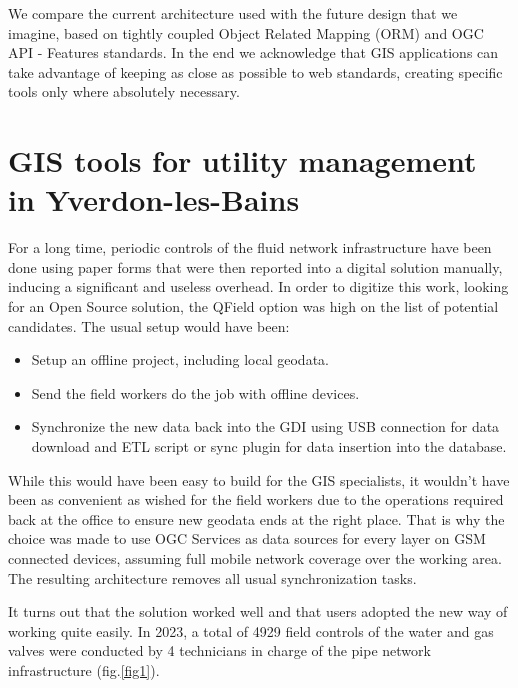 \documentclass[runningheads]{llncs}
\begin{document}
We compare the current architecture used with the future design that we imagine, based on tightly coupled Object Related Mapping (ORM) and OGC API - Features standards. In the end we acknowledge that GIS applications can take advantage of keeping as close as possible to web standards, creating specific tools only where absolutely necessary.

\section{GIS tools for utility management in Yverdon-les-Bains}

For a long time, periodic controls of the fluid network infrastructure have been done using paper forms that were then reported into a digital solution manually, inducing a significant and useless overhead. In order to digitize this work, looking for an Open Source solution, the QField option was high on the list of potential candidates. The usual setup would have been:
\begin{itemize}
	\item Setup an offline project, including local geodata.
	\item Send the field workers do the job with offline devices.
	\item Synchronize the new data back into the GDI using USB connection for data download and ETL script or sync plugin for data insertion into the database.
\end{itemize}



While this would have been easy to build for the GIS specialists, it wouldn’t have been as convenient as wished for the field workers due to the operations required back at the office to ensure new geodata ends at the right place. That is why the choice was made to use OGC Services as data sources for every layer on GSM connected devices, assuming full mobile network coverage over the working area. The resulting architecture removes all usual synchronization tasks.

It turns out that the solution worked well and that users adopted the new way of working quite easily. In 2023, a total of 4929 field controls of the water and gas valves were conducted by 4 technicians in charge of the pipe network infrastructure (fig.\ref{fig1}).
\end{document}
